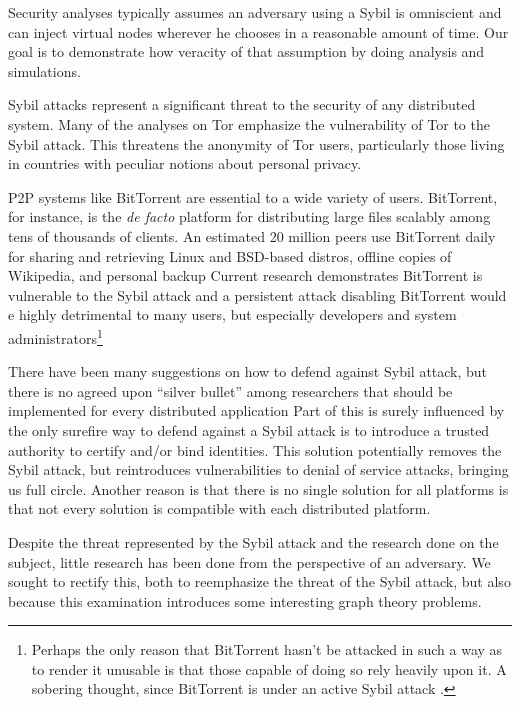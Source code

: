 \documentclass[a4paper]{article}
\begin{document}
Security analyses typically assumes an adversary using a Sybil is omniscient and can inject virtual nodes wherever he chooses in a reasonable amount of time. 
Our goal is to demonstrate how veracity of that assumption by doing analysis and simulations.

Sybil attacks represent a significant threat to the security of any distributed system.
Many of the analyses \cite{bauer2007low} on Tor \cite{dingledine2004tor} emphasize the vulnerability of Tor to the Sybil attack.
This threatens the anonymity of Tor users, particularly those living in countries with peculiar notions about personal privacy.

P2P systems like BitTorrent are essential to a wide variety of users.
BitTorrent, for instance, is the \textit{de facto} platform for distributing large files scalably among tens of thousands of clients.
An estimated 20 million peers use BitTorrent daily for sharing and retrieving Linux and BSD-based distros, offline copies of Wikipedia, and personal backup
Current research demonstrates  BitTorrent is vulnerable to the Sybil attack and a persistent attack disabling BitTorrent would e highly detrimental to many users, but especially developers and system administrators\footnote{Perhaps the only reason that BitTorrent hasn't be attacked in such a way as to render it unusable is that those capable of doing so rely heavily upon it.  A sobering thought, since BitTorrent is under an active Sybil attack \cite{sybilbit}. }


There have been many suggestions on how to defend against Sybil attack, but there is no agreed upon ``silver bullet'' among researchers that should be implemented for every distributed application \cite{levine2006survey}
Part of this is surely influenced by the only surefire way to defend against a Sybil attack is to introduce a trusted authority to certify and/or bind identities.
This solution potentially removes the Sybil attack, but reintroduces vulnerabilities to denial of service attacks, bringing us full circle.
Another reason is that there is no single solution for all platforms is that not every solution is compatible with each distributed platform.


Despite the threat represented by the Sybil attack and the research done on the subject, little research has been done from the perspective of an adversary.
We sought to rectify this, both to reemphasize the threat of the Sybil attack, but also because this examination introduces some interesting graph theory problems.
\end{document}
